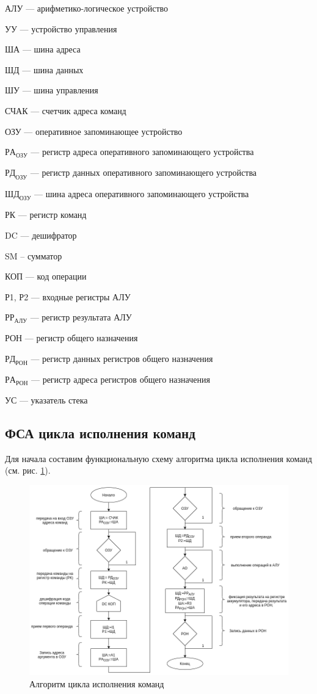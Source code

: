 \documentclass[a4paper,14pt]{extarticle}
\begin{document}
АЛУ --- арифметико-логическое устройство

УУ --- устройство управления

ША --- шина адреса

ШД --- шина данных

ШУ --- шина управления

СЧАК --- счетчик адреса команд

ОЗУ  --- оперативное запоминающее устройство

$РА_{ОЗУ}$ --- регистр адреса оперативного запоминающего устройства

$РД_{ОЗУ}$ --- регистр данных оперативного запоминающего устройства

$ШД_{ОЗУ}$ --- шина адреса оперативного запоминающего устройства

РК  --- регистр команд


DC  --- дешифратор

SM -- сумматор

КОП --- код операции

Р1, Р2 --- входные регистры АЛУ

$РР_{АЛУ}$ --- регистр результата АЛУ

РОН --- регистр общего назначения


$РД_{РОН}$  --- регистр данных регистров общего назначения

$РА_{РОН}$  --- регистр адреса регистров общего назначения

УС --- указатель стека


\subsection{ФСА цикла исполнения команд}

Для начала составим функциональную схему алгоритма цикла исполнения команд (см. рис. \ref{fig:func-alg}).


\begin{figure}[htbp]
	\centering
	\includegraphics[width=0.7\linewidth]{images/func-alg-pr1}
	\caption{Алгоритм цикла исполнения команд}
	\label{fig:func-alg}
\end{figure}
\newpage
\end{document}
